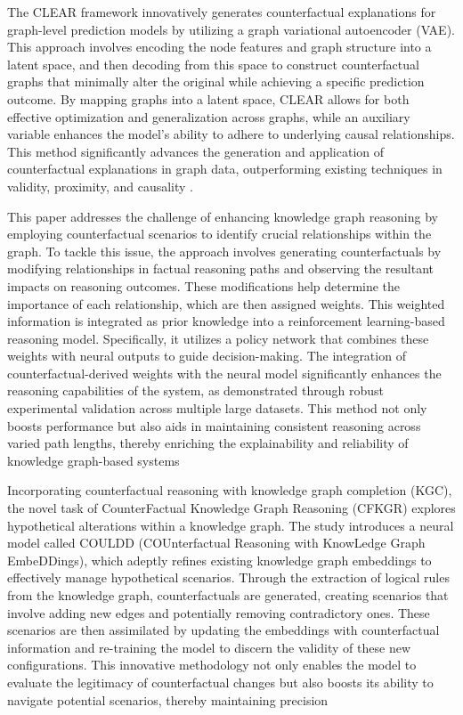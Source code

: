 The CLEAR framework innovatively generates counterfactual explanations for graph-level
prediction models by utilizing a graph variational autoencoder (VAE). This
approach involves encoding the node features and graph structure into a latent
space, and then decoding from this space to construct counterfactual graphs that
minimally alter the original while achieving a specific prediction outcome. By
mapping graphs into a latent space, CLEAR allows for both effective optimization
and generalization across graphs, while an auxiliary variable enhances the
model’s ability to adhere to underlying causal relationships. This method significantly
advances the generation and application of counterfactual explanations in graph data,
outperforming existing techniques in validity, proximity, and causality \parencite{ma_clear_2022}.

This paper addresses the challenge of enhancing knowledge graph reasoning by
employing counterfactual scenarios to identify crucial relationships within the
graph. To tackle this issue, the approach involves generating counterfactuals by
modifying relationships in factual reasoning paths and observing the resultant
impacts on reasoning outcomes. These modifications help determine the importance
of each relationship, which are then assigned weights. This weighted information
is integrated as prior knowledge into a reinforcement learning-based reasoning model.
Specifically, it utilizes a policy network that combines these weights with neural
outputs to guide decision-making. The integration of counterfactual-derived
weights with the neural model significantly enhances the reasoning capabilities
of the system, as demonstrated through robust experimental validation across multiple
large datasets. This method not only boosts performance but also aids in
maintaining consistent reasoning across varied path lengths, thereby enriching the
explainability and reliability of knowledge graph-based systems \parencite{wang_incorporating_2021}

Incorporating counterfactual reasoning with knowledge graph completion (KGC), the
novel task of CounterFactual Knowledge Graph Reasoning (CFKGR) explores hypothetical
alterations within a knowledge graph. The study introduces a neural model called
COULDD (COUnterfactual Reasoning with KnowLedge Graph EmbeDDings), which adeptly
refines existing knowledge graph embeddings to effectively manage hypothetical scenarios.
Through the extraction of logical rules from the knowledge graph, counterfactuals
are generated, creating scenarios that involve adding new edges and potentially
removing contradictory ones. These scenarios are then assimilated by updating the
embeddings with counterfactual information and re-training the model to discern the
validity of these new configurations. This innovative methodology not only
enables the model to evaluate the legitimacy of counterfactual changes but also
boosts its ability to navigate potential scenarios, thereby maintaining precision
\parencite{zellinger_counterfactual_2024}

